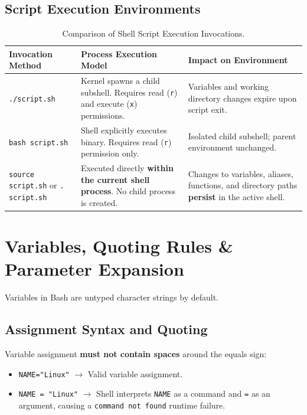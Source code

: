 \subsection{Script Execution Environments}
\begin{table}[htbp]
\centering
\small
\begin{tabularx}{\linewidth}{l X X}
\toprule
\textbf{Invocation Method} & \textbf{Process Execution Model} & \textbf{Impact on Environment} \\
\midrule
\texttt{./script.sh} & Kernel spawns a child subshell. Requires read (\texttt{r}) and execute (\texttt{x}) permissions. & Variables and working directory changes expire upon script exit. \\
\texttt{bash script.sh} & Shell explicitly executes binary. Requires read (\texttt{r}) permission only. & Isolated child subshell; parent environment unchanged. \\
\texttt{source script.sh} or \texttt{. script.sh} & Executed directly \textbf{within the current shell process}. No child process is created. & Changes to variables, aliases, functions, and directory paths \textbf{persist} in the active shell. \\
\bottomrule
\end{tabularx}
\caption{Comparison of Shell Script Execution Invocations.}
\label{tab:script-exec}
\end{table}

\section{Variables, Quoting Rules \& Parameter Expansion}
Variables in Bash are untyped character strings by default.

\subsection{Assignment Syntax and Quoting}
\begin{warningbox}
Variable assignment \textbf{must not contain spaces} around the equals sign:
\begin{itemize}
    \item \texttt{NAME="Linux"} $\to$ Valid variable assignment.
    \item \texttt{NAME = "Linux"} $\to$ Shell interprets \texttt{NAME} as a command and \texttt{=} as an argument, causing a \texttt{command not found} runtime failure.
\end{itemize}
\end{warningbox}

